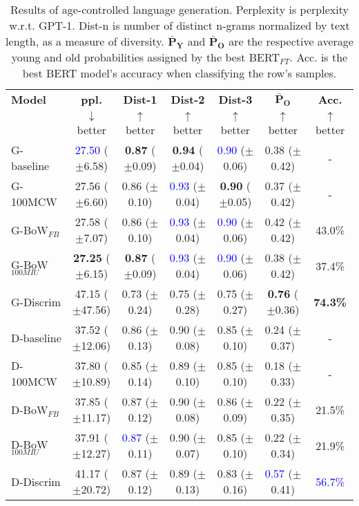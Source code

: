 \begin{table*}[h]
    \centering
    \begin{tabular}{l | c c c c | c c }
    \toprule
    \textbf{Model} & \textbf{ppl.} & \textbf{Dist-1} & \textbf{Dist-2} & \textbf{Dist-3} & $\boldsymbol{\bar{P}_O}$ & \textbf{Acc.}\\
     & $\downarrow$ better & $\uparrow$ better & $\uparrow$ better & $\uparrow$ better & $\uparrow$ better & $\uparrow$ better\\
    \midrule
    \midrule
    G-baseline & \textcolor{blue}{27.50} ($\pm$6.58) & \textbf{0.87} ($\pm$0.09) & \textbf{0.94} ($\pm$0.04) & \textcolor{blue}{0.90} ($\pm$0.06) & 0.38 ($\pm$0.42) & -\\
    G-100MCW & 27.56 ($\pm$6.60) & 0.86 ($\pm$0.10) & \textcolor{blue}{0.93} ($\pm$0.04) & \textbf{0.90} ($\pm$0.05) & 0.37 ($\pm$0.42) & -\\
    \midrule
    G-BoW$_{FB}$ & 27.58 ($\pm$7.07) & 0.86 ($\pm$0.10) & \textcolor{blue}{0.93} ($\pm$0.04) & \textcolor{blue}{0.90} ($\pm$0.06) & 0.42 ($\pm$0.42) & 43.0\%\\
    G-BoW$_{100MIU}$ & \textbf{27.25} ($\pm$6.15) & \textbf{0.87} ($\pm$0.09) & \textcolor{blue}{0.93} ($\pm$0.04) & \textcolor{blue}{0.90} ($\pm$0.06) & 0.38 ($\pm$0.42) & 37.4\%\\
    \midrule
    G-Discrim & 47.15 ($\pm$47.56) & 0.73 ($\pm$0.24) & 0.75 ($\pm$0.28) & 0.75 ($\pm$0.27) & \textbf{0.76} ($\pm$0.36) & \textbf{74.3\%}\\
    \midrule
    \midrule
    D-baseline & 37.52 ($\pm$12.06) & 0.86 ($\pm$0.13) & 0.90 ($\pm$0.08) & 0.85 ($\pm$0.10) & 0.24 ($\pm$0.37) & -\\
    D-100MCW & 37.80 ($\pm$10.89) & 0.85 ($\pm$0.14) & 0.89 ($\pm$0.10) & 0.85 ($\pm$0.10) & 0.18 ($\pm$0.33) & -\\
    \midrule
    D-BoW$_{FB}$ & 37.85 ($\pm$11.17) & 0.87 ($\pm$0.12) & 0.90 ($\pm$0.08) & 0.86 ($\pm$0.09) & 0.22 ($\pm$0.35) & 21.5\%\\
    D-BoW$_{100MIU}$ & 37.91 ($\pm$12.27) & \textcolor{blue}{0.87} ($\pm$0.11) & 0.90 ($\pm$0.07) & 0.85 ($\pm$0.10) & 0.22 ($\pm$0.34) & 21.9\%\\
    \midrule
    D-Discrim & 41.17 ($\pm$20.72) & 0.87 ($\pm$0.12) & 0.89 ($\pm$0.13) & 0.83 ($\pm$0.16) & \textcolor{blue}{0.57} ($\pm$0.41) & \textcolor{blue}{56.7\%}\\
    \bottomrule
    \end{tabular}
    \caption{ Results of age-controlled language generation. Perplexity is perplexity w.r.t. GPT-1. Dist-n is number of distinct n-grams normalized by text length, as a measure of diversity. $\boldsymbol{\bar{P}_Y}$ and $\boldsymbol{\bar{P}_O}$ are the respective average young and old probabilities assigned by the best BERT$_{FT}$. Acc. is the best BERT model's accuracy when classifying the row's samples.}
    \label{tab:ctg_results_ws_neutral_prompt_old_model}
\end{table*}


